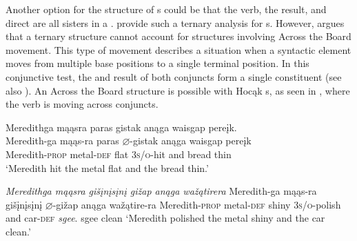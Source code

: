 \documentclass[output=paper]{LSP/langsci}
\begin{document}
Another option for the structure of s could be that the verb, the result, and direct  are all sisters in a .  \citet{Carrier1992} provide such a ternary analysis for  s. However, \citet{Bowers1997} argues that a ternary structure cannot account for structures involving Across the Board movement. This type of movement describes a situation when a syntactic element moves from multiple base positions to a single terminal position. In this conjunctive test, the  and result of both conjuncts form a single constituent (see also \citealt{Li1999}). An Across the Board structure is possible with Hocąk s, as seen in , where the verb is moving across conjuncts.

\begin{exe}
\ex\label{ex:rosen:26}
\begin{xlist}

\ex \glll Meredithga mąąsra paras gistak anąga waisgap pereįk. \\
Meredith-ga mąąs-ra paras {$\varnothing$}-gistak anąga waisgap pereįk\\
Meredith-\textsc{prop} metal-\textsc{def} flat \textsc{3s/o}-hit and bread thin\\
\glt `Meredith hit the metal flat and the bread thin.'

\ex \textit{Meredithga \hspace{1.58em} mąąsra \hspace{.9em} gišįnį{s}įnį \hspace{.1em}gižap  \hspace {2.4em} anąga wažątirera}  \newline Meredith-ga \hspace{1.18em} mąąs-ra \hspace {.5em} gišįnį{s}įnį {$\varnothing$}-gižap \hspace{1.3em} anąga wažątire-ra \newline Meredith-\textsc{prop} metal-\textsc{def} shiny \hspace{1.6em} \textsc{3s/o}-polish and \hspace{1em} car-\textsc{def} \newline\textit{sgee}. \newline
sgee \newline
clean \newline
`Meredith polished the metal shiny and the car clean.'

\end{xlist}
\end{exe}
 
\end{document}
